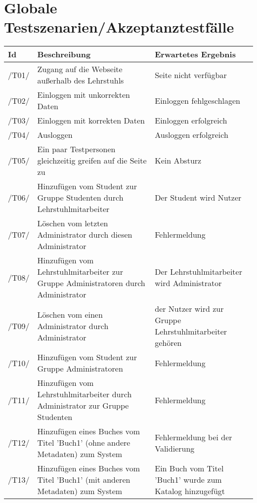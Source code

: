 \documentclass[12pt, a4paper]{article}
\begin{document}
\section{Globale Testszenarien/Akzeptanztestfälle}
\begin{table}[h]
	\begin{tabular}{p{1.2cm}|p{6.5cm}|p{5.5cm}}
		\textbf{Id} & \textbf{Beschreibung} & \textbf{Erwartetes Ergebnis}\\
		\hline
		/T01/ & Zugang auf die Webseite außerhalb des Lehrstuhls & Seite nicht verfügbar\\
		\hline
		/T02/ & Einloggen mit unkorrekten Daten & Einloggen fehlgeschlagen\\		
		\hline
		/T03/ & Einloggen mit korrekten Daten & Einloggen erfolgreich\\
		\hline
		/T04/ & Ausloggen & Ausloggen erfolgreich\\
		\hline
		/T05/ & Ein paar Testpersonen gleichzeitig greifen auf die Seite zu & Kein Absturz\\
		\hline
		/T06/ & Hinzufügen vom Student zur Gruppe Studenten durch Lehrstuhlmitarbeiter & Der Student wird Nutzer\\
		\hline
		/T07/ & Löschen vom letzten Administrator durch diesen Administrator & Fehlermeldung\\
		\hline
		/T08/ & Hinzufügen vom Lehrstuhlmitarbeiter zur Gruppe Administratoren durch Administrator & Der Lehrstuhlmitarbeiter wird Administrator\\
		\hline
		/T09/ & Löschen vom einen Administrator durch Administrator & der Nutzer wird zur Gruppe Lehrstuhlmitarbeiter gehören\\
		\hline
		/T10/ & Hinzufügen vom Student zur Gruppe Administratoren & Fehlermeldung\\
		/T11/ & Hinzufügen vom Lehrstuhlmitarbeiter durch Administrator zur Gruppe Studenten & Fehlermeldung\\
		\hline
		/T12/ & Hinzufügen eines Buches vom Titel  'Buch1'  (ohne andere Metadaten) zum System & Fehlermeldung bei der Validierung\\
		\hline
		/T13/ & Hinzufügen eines Buches vom Titel  'Buch1'  (mit anderen Metadaten) zum System & Ein Buch vom Titel  'Buch1'  wurde zum Katalog hinzugefügt\\
    \end{tabular}
\end{table}
    
\end{document}
